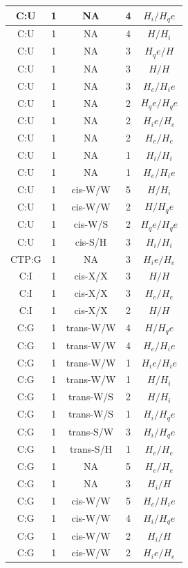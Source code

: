 \begin{center}
\begin{longtable}{c|c|c|c|c}
C:U & 1 & NA & 4 & $H_i/H_qe$ \\  \hline
C:U & 1 & NA & 4 & $H/H_i$ \\  \hline
C:U & 1 & NA & 3 & $H_qe/H$ \\  \hline
C:U & 1 & NA & 3 & $H/H$ \\  \hline
C:U & 1 & NA & 3 & $H_e/H_ie$ \\  \hline
C:U & 1 & NA & 2 & $H_qe/H_qe$ \\  \hline
C:U & 1 & NA & 2 & $H_ie/H_e$ \\  \hline
C:U & 1 & NA & 2 & $H_e/H_e$ \\  \hline
C:U & 1 & NA & 1 & $H_i/H_i$ \\  \hline
C:U & 1 & NA & 1 & $H_e/H_ie$ \\  \hline
C:U & 1 & cis-W/W & 5 & $H/H_i$ \\  \hline
C:U & 1 & cis-W/W & 2 & $H/H_qe$ \\  \hline
C:U & 1 & cis-W/S & 2 & $H_qe/H_qe$ \\  \hline
C:U & 1 & cis-S/H & 3 & $H_i/H_i$ \\  \hline
CTP:G & 1 & NA & 3 & $H_ie/H_e$ \\  \hline
C:I & 1 & cis-X/X & 3 & $H/H$ \\  \hline
C:I & 1 & cis-X/X & 3 & $H_e/H_e$ \\  \hline
C:I & 1 & cis-X/X & 2 & $H/H$ \\  \hline
C:G & 1 & trans-W/W & 4 & $H/H_qe$ \\  \hline
C:G & 1 & trans-W/W & 4 & $H_e/H_ie$ \\  \hline
C:G & 1 & trans-W/W & 1 & $H_ie/H_ie$ \\  \hline
C:G & 1 & trans-W/W & 1 & $H/H_i$ \\  \hline
C:G & 1 & trans-W/S & 2 & $H/H_i$ \\  \hline
C:G & 1 & trans-W/S & 1 & $H_i/H_qe$ \\  \hline
C:G & 1 & trans-S/W & 3 & $H_i/H_qe$ \\  \hline
C:G & 1 & trans-S/H & 1 & $H_e/H_e$ \\  \hline
C:G & 1 & NA & 5 & $H_e/H_e$ \\  \hline
C:G & 1 & NA & 3 & $H_i/H$ \\  \hline
C:G & 1 & cis-W/W & 5 & $H_e/H_ie$ \\  \hline
C:G & 1 & cis-W/W & 4 & $H_i/H_qe$ \\  \hline
C:G & 1 & cis-W/W & 2 & $H_i/H$ \\  \hline
C:G & 1 & cis-W/W & 2 & $H_ie/H_e$ \\  \hline

\end{longtable}
\end{center}
